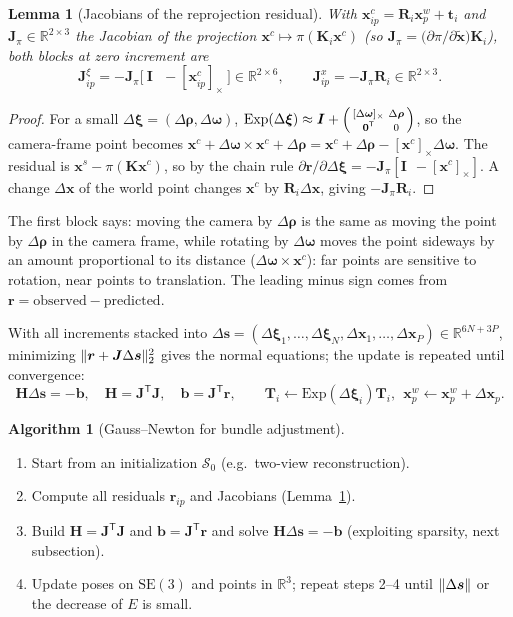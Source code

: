 \documentclass[11pt,a4paper]{article}
\newcommand{\R}{\mathbb{R}}
\newcommand{\SE}{\mathrm{SE}(3)}
\newcommand{\sk}[1]{[#1]_{\times}}
\newcommand{\tr}{^{\mathsf T}}
\theoremstyle{definition}
\newtheorem{algorithm}{Algorithm}[section]
\theoremstyle{plain}
\newtheorem{lemma}[definition]{Lemma}
\theoremstyle{remark}
\begin{document}
\begin{lemma}[Jacobians of the reprojection residual]\label{lem:jac}
With $\bm x^c_{ip}=\bm R_i\bm x^w_p+\bm t_i$ and $\bm J_\pi\in\R^{2\times3}$ the Jacobian of the projection $\bm x^c\mapsto\pi(\bm K_i\bm x^c)$ (so $\bm J_\pi=\bigl(\partial\pi/\partial\tilde{\bm x}\bigr)\bm K_i$), both blocks at zero increment are
\[
\bm J^{\xi}_{ip}=-\bm J_\pi\bigl[\ \bm I\ \ \ -\sk{\bm x^c_{ip}}\ \bigr]\in\R^{2\times6},\qquad
\bm J^x_{ip}=-\bm J_\pi\bm R_i\in\R^{2\times3}.
\]
\end{lemma}
\begin{proof}
For a small $\Delta\bm\xi=(\Delta\bm\rho,\Delta\bm\omega)$, $\mathrm{Exp}(\Delta\bm\xi)\approx\bm I+\begin{psmallmatrix}\sk{\Delta\bm\omega}&\Delta\bm\rho\\\bm 0\tr&0\end{psmallmatrix}$, so the camera-frame point becomes
$\bm x^c+\Delta\bm\omega\times\bm x^c+\Delta\bm\rho=\bm x^c+\Delta\bm\rho-\sk{\bm x^c}\Delta\bm\omega$. The residual is $\bm x^s-\pi(\bm K\bm x^c)$, so by the chain rule $\partial\bm r/\partial\Delta\bm\xi=-\bm J_\pi[\bm I\ \ -\sk{\bm x^c}]$.
A change $\Delta\bm x$ of the world point changes $\bm x^c$ by $\bm R_i\Delta\bm x$, giving $-\bm J_\pi\bm R_i$.
\end{proof}

\begin{intuition}
The first block says: moving the camera by $\Delta\bm\rho$ is the same as moving the point by $\Delta\bm\rho$ in the camera frame, while rotating by $\Delta\bm\omega$ moves the point sideways by an amount proportional to its distance ($\Delta\bm\omega\times\bm x^c$): far points are sensitive to rotation, near points to translation. The leading minus sign comes from $\bm r=\text{observed}-\text{predicted}$.
\end{intuition}

With all increments stacked into $\Delta\bm s=(\Delta\bm\xi_1,\dots,\Delta\bm\xi_N,\Delta\bm x_1,\dots,\Delta\bm x_P)\in\R^{6N+3P}$, minimizing $\lVert \bm r+\bm J\Delta\bm s\rVert_2^2$ gives the normal equations; the update is repeated until convergence:
\[
\bm H\Delta\bm s=-\bm b,\quad \bm H=\bm J\tr\bm J,\quad\bm b=\bm J\tr\bm r,\qquad \bm T_i\leftarrow\mathrm{Exp}(\Delta\bm\xi_i)\bm T_i,\ \ \bm x^w_p\leftarrow\bm x^w_p+\Delta\bm x_p .
\]

\begin{algorithm}[Gauss--Newton for bundle adjustment]\label{alg:gn}
\begin{enumerate}[nosep]
\item Start from an initialization $\mathcal S_0$ (e.g.\ two-view reconstruction).
\item Compute all residuals $\bm r_{ip}$ and Jacobians (Lemma~\ref{lem:jac}).
\item Build $\bm H=\bm J\tr\bm J$ and $\bm b=\bm J\tr\bm r$ and solve $\bm H\Delta\bm s=-\bm b$ (exploiting sparsity, next subsection).
\item Update poses on $\SE$ and points in $\R^3$; repeat steps 2--4 until $\lVert \Delta\bm s\rVert$ or the decrease of $E$ is small.
\end{enumerate}
\end{algorithm}
\end{document}
